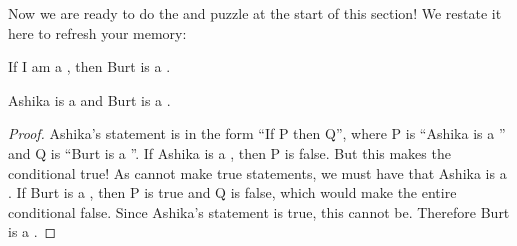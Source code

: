 \documentclass{tufte-book}
\begin{document}




Now we are ready to do the \knights and \knaves puzzle at the start of this section! We restate it here to refresh your memory:
  \begin{dialogue}
     If I am a \knight, then Burt is a \knave.
  \end{dialogue}

  \begin{claim}
    Ashika is a \knight and Burt is a \knave.
  \end{claim}

  \begin{proof}
    Ashika's statement is in the form ``If P then Q'', where P is ``Ashika is a \knight'' and Q is ``Burt is a \knave''. If Ashika is a \knave, then P is false. But this makes the conditional true! As \knaves cannot make true statements, we must have that Ashika is a \knight. If Burt is a \knight, then P is true and Q is false, which would make the entire conditional false. Since Ashika's statement is true, this cannot be. Therefore Burt is a \knave.
  \end{proof} 
\end{document}
